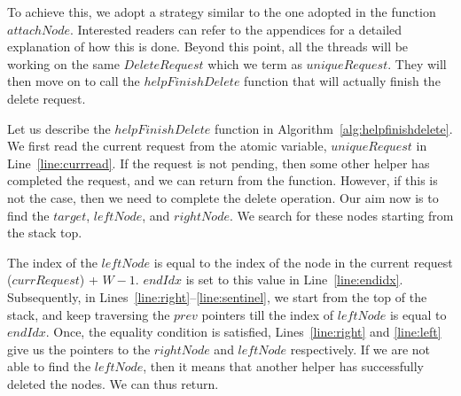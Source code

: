 \documentclass{llncs}
\begin{document}
To achieve this, we adopt a strategy similar to the one adopted in the function $attachNode$. 
Interested readers can refer to the appendices for a detailed explanation of how this is done.
Beyond this point, all the threads will be working on the same $DeleteRequest$ which we term as $uniqueRequest$. 
They will then move on to call the $helpFinishDelete$ function that will actually finish the delete request.

Let us describe the $helpFinishDelete$ function in Algorithm~\ref{alg:helpfinishdelete}. 
We first read the current request from the atomic variable, $uniqueRequest$ in Line~\ref{line:currread}. If
the request is not pending, then some other helper has completed the request, and we can return from the function.
However, if this is not the case, then we need to complete the delete operation. Our aim now is to find the $target$,
$leftNode$, and $rightNode$. We search for these nodes starting from the stack top.

The index of the $leftNode$ is equal to the index of the node in the current request ($currRequest$) + $W-1$. 
$endIdx$ is set to this value in Line~\ref{line:endidx}.
Subsequently, in Lines~\ref{line:right}--\ref{line:sentinel}, we start from the top of the stack, and keep traversing the $prev$
pointers till the index of $leftNode$ is equal to $endIdx$. Once, the equality condition is satisfied,
Lines~\ref{line:right} and \ref{line:left} give us the pointers to the $rightNode$ and $leftNode$ respectively. If
we are not able to find the $leftNode$, then it means that another helper has successfully deleted the nodes. We can
thus return. \\
\end{document}
